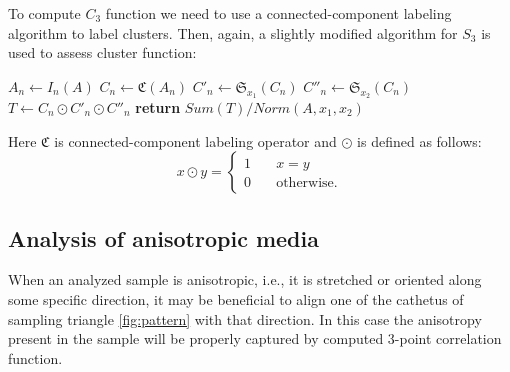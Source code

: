 \documentclass[reprint,amsmath,amssymb,aps,pre,showkeys,showpacs]{revtex4-1}
\begin{document}
To compute $C_3$ function we need to use a connected-component labeling
algorithm \cite{4728561,PhysRevB.14.3438} to label clusters. Then, again, a
slightly modified algorithm for $S_3$ is used to assess cluster function:
\begin{algorithmic}[1]
  \State $A_n \gets I_n (A)$
  \State $C_n \gets \mathfrak{C}(A_n)$
  \State $C'_n \gets \mathfrak{S}_{x_1}(C_n)$
  \State $C''_n \gets \mathfrak{S}_{x_2}(C_n)$
  \State $T \gets C_n \odot C'_n \odot C''_n$
  \State \textbf{return} $Sum(T) / Norm(A, x_1, x_2)$
  \EndProcedure
\end{algorithmic}
Here $\mathfrak{C}$ is connected-component labeling operator and $\odot$ is
defined as follows:
\begin{equation}
  x \odot y = \left\{
  \begin{array}{ll}
    1 & \quad x = y \\
    0 & \quad \text{otherwise}.
  \end{array}
  \right.
\end{equation}

\subsection{Analysis of anisotropic media}
When an analyzed sample is anisotropic, i.e., it is stretched or oriented along
some specific direction, it may be beneficial to align one of the cathetus of
sampling triangle \cref{fig:pattern} with that direction. In this case the
anisotropy present in the sample will be properly captured by computed 3-point
correlation function.
\end{document}

